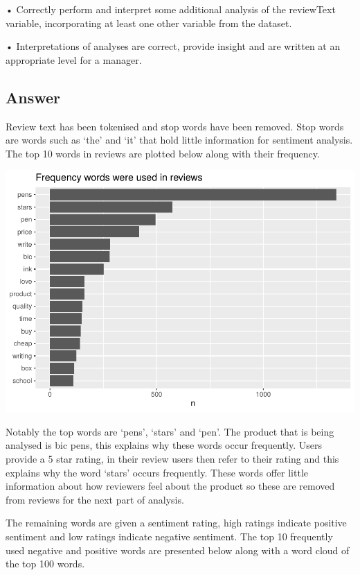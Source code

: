\documentclass[
  11pt,
]{article}
\begin{document}
• Correctly perform and interpret some additional analysis of the
reviewText variable, incorporating at least one other variable from the
dataset.

• Interpretations of analyses are correct, provide insight and are
written at an appropriate level for a manager.

\hypertarget{answer-3}{%
\subsection{Answer}\label{answer-3}}

Review text has been tokenised and stop words have been removed. Stop
words are words such as `the' and `it' that hold little information for
sentiment analysis. The top 10 words in reviews are plotted below along
with their frequency.

\includegraphics{Assignment-STAT702_files/figure-latex/3b word frequency-1.pdf}

Notably the top words are `pens', `stars' and `pen'. The product that is
being analysed is bic pens, this explains why these words occur
frequently. Users provide a 5 star rating, in their review users then
refer to their rating and this explains why the word `stars' occurs
frequently. These words offer little information about how reviewers
feel about the product so these are removed from reviews for the next
part of analysis.

The remaining words are given a sentiment rating, high ratings indicate
positive sentiment and low ratings indicate negative sentiment. The top
10 frequently used negative and positive words are presented below along
with a word cloud of the top 100 words.
\end{document}
